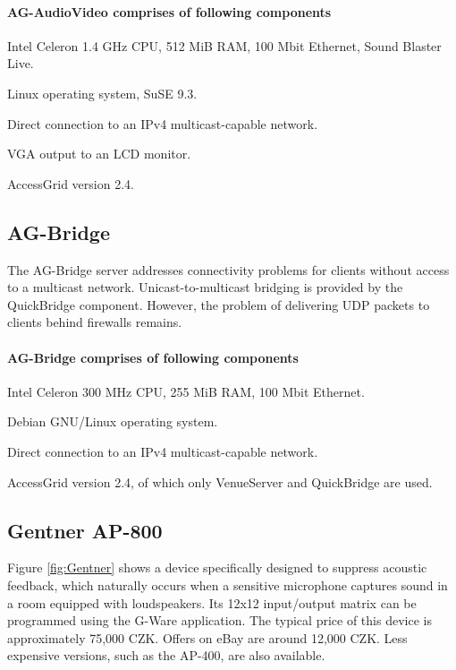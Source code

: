 \paragraph*{AG-AudioVideo comprises of following components}
\begin{paklist}
\item Intel Celeron 1.4 GHz CPU, 512 MiB RAM, 100 Mbit Ethernet, Sound Blaster Live.
\item Linux operating system, SuSE 9.3.
\item Direct connection to an IPv4 multicast-capable network.
\item VGA output to an LCD monitor.
\item AccessGrid version 2.4.
\end{paklist}

\subsection{AG-Bridge}\label{kap:CIANT-AG-Bridge}
The AG-Bridge server addresses connectivity problems for clients without access to a multicast network. Unicast-to-multicast bridging is provided by the QuickBridge component. However, the problem of delivering UDP packets to clients behind firewalls remains.

\paragraph*{AG-Bridge comprises of following components}
\begin{paklist}
\item Intel Celeron 300 MHz CPU, 255 MiB RAM, 100 Mbit Ethernet.
\item Debian GNU/Linux operating system.
\item Direct connection to an IPv4 multicast-capable network.
\item AccessGrid version 2.4, of which only VenueServer and QuickBridge are used.
\end{paklist}

\subsection{Gentner AP-800}
Figure \ref{fig:Gentner} shows a device specifically designed to suppress acoustic feedback, which naturally occurs when a sensitive microphone captures sound in a room equipped with loudspeakers. Its 12x12 input/output matrix can be programmed using the G-Ware application. The typical price of this device is approximately 75,000 CZK. Offers on eBay are around 12,000 CZK. Less expensive versions, such as the AP-400, are also available.

